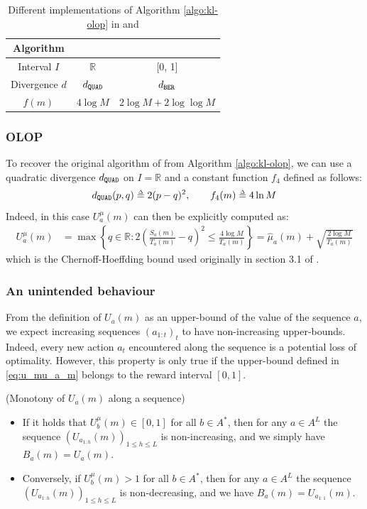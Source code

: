 \begin{table}[tp]
	\caption{Different implementations of Algorithm \ref{algo:kl-olop} in \OLOP and \KLOLOP}
	\label{tab:comparison}
	\centering
	\begin{tabular}{ccc}
		\toprule
		Algorithm & \OLOP & \KLOLOP \\
		\midrule
		Interval $I$ & $\mathbb{R}$ & [0, 1] \\
		Divergence $d$ & $d_\texttt{QUAD}$ & $d_\texttt{BER}$ \\
		$f(m)$ & $4 \log M$ & $2\log M + 2 \log\log M$\\
		\bottomrule
	\end{tabular}
\end{table}

\subsubsection{OLOP}
\label{sec:kl-olop-olop}
To recover the original \OLOP algorithm of \citet{Bubeck2010} from Algorithm \ref{algo:kl-olop}, we can use a quadratic divergence $d_\texttt{QUAD}$ on $I=\mathbb{R}$ and a constant function $f_4$ defined as follows:
\begin{equation*}
\dquad(p,q) \eqdef 2(p-q)^2,\qquad
f_4(m) \eqdef 4 \log M
\end{equation*}
Indeed, in this case $U^{\mu}_a(m)$ can then be explicitly computed as:
\begin{align*}
U^{\mu}_a(m) &= \max \left\{q\in \mathbb{R}: 2(\frac{S_a(m)}{T_a(m)} - q)^2 \leq \frac{4 \log M }{T_a(m)} \right\} = \hat{\mu}_a(m) + \sqrt{\frac{2 \log M}{T_a(m)}}
\end{align*}
which is the Chernoff-Hoeffding bound used originally in section 3.1 of \cite{Bubeck2010}.

\subsubsection{An unintended behaviour}
\label{sec:kl-olop-behaviour}
From the definition of $U_a(m)$ as an upper-bound of the value of the sequence $a$, we expect increasing sequences $(a_{1:t})_t$ to have non-increasing upper-bounds. Indeed, every new action $a_t$ encountered along the sequence is a potential loss of optimality.
However, this property is only true if the upper-bound defined in \eqref{eq:u_mu_a_m} belongs to the reward interval $[0,1]$.

\begin{lemma}(Monotony of $U_a(m)$ along a sequence)
	\label{lemma:seq_values}
	\begin{leftbar}[lemmabar]
	\begin{itemize}
		\item If it holds that $U^{\mu}_b(m) \in [0, 1]$ for all $b\in A^*$, then for any $a\in A^L$ the sequence $(U_{a_{1:h}}(m))_{1\leq h \leq L}$ is non-increasing, and we simply have $B_a(m) = U_a(m)$.
		\item Conversely, if $U^{\mu}_b(m) > 1$ for all $b\in A^*$, then for any $a\in A^L$ the sequence $(U_{a_{1:h}}(m))_{1\leq h \leq L}$ is non-decreasing, and we have $B_a(m) = U_{a_{1:1}}(m)$.
	\end{itemize}
	\end{leftbar}
\end{lemma}

